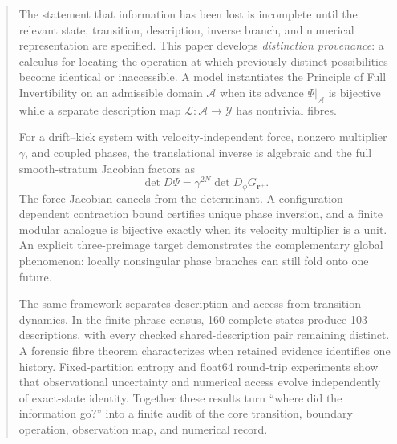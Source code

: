 \documentclass[10pt]{article}
\theoremstyle{definition}
\theoremstyle{remark}
\newcommand{\Y}{\mathcal Y}
\newcommand{\A}{\mathcal A}
\newcommand{\Obs}{\mathcal L}
\begin{document}
\begin{titlepage}

\vspace{0.35in}
\noindent{\color{fiblue}\rule{\linewidth}{0.8pt}}
\end{titlepage}
\hypersetup{pageanchor=true}

\begin{abstract}
The statement that information has been lost is incomplete until the relevant state, transition, description, inverse branch, and numerical representation are specified. This paper develops \emph{distinction provenance}: a calculus for locating the operation at which previously distinct possibilities become identical or inaccessible. A model instantiates the Principle of Full Invertibility on an admissible domain \(\A\) when its advance \(\Psi|_{\A}\) is bijective while a separate description map \(\Obs:\A\to\Y\) has nontrivial fibres.

For a drift--kick system with velocity-independent force, nonzero multiplier \(\gamma\), and coupled phases, the translational inverse is algebraic and the full smooth-stratum Jacobian factors as
\[
\det D\Psi=\gamma^{2N}\det D_\phi G_{\bm r^+}.
\]
The force Jacobian cancels from the determinant. A configuration-dependent contraction bound certifies unique phase inversion, and a finite modular analogue is bijective exactly when its velocity multiplier is a unit. An explicit three-preimage target demonstrates the complementary global phenomenon: locally nonsingular phase branches can still fold onto one future.

The same framework separates description and access from transition dynamics. In the finite phrase census, 160 complete states produce 103 descriptions, with every checked shared-description pair remaining distinct. A forensic fibre theorem characterizes when retained evidence identifies one history. Fixed-partition entropy and float64 round-trip experiments show that observational uncertainty and numerical access evolve independently of exact-state identity. Together these results turn ``where did the information go?'' into a finite audit of the core transition, boundary operation, observation map, and numerical record.
\end{abstract}
\end{document}
